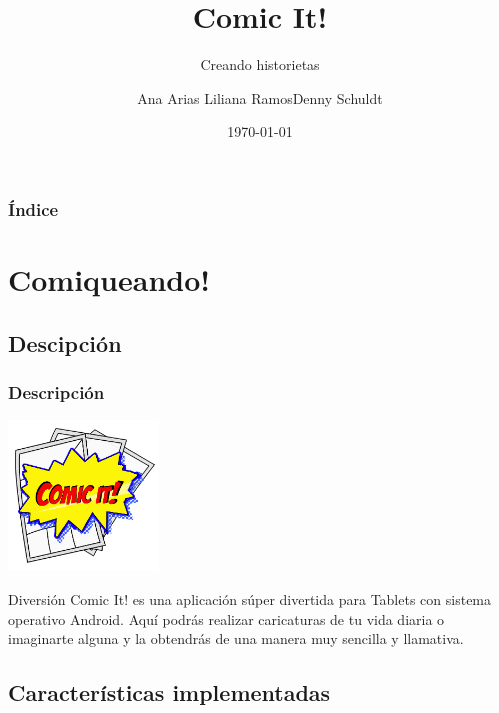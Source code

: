 \documentclass[utf8]{beamer}
\title[Comic It!]{Comic It!}
\subtitle{Creando historietas}
\author[Ana Arias,Liliana Ramos,Denny Schuldt]
{Ana Arias \newline Liliana Ramos\newline Denny Schuldt}
\institute[ESPOL]
{
  Escuela Superior Politécnica del Litoral

}
\date{\today}
\begin{document}
\frame{\titlepage}

\begin{frame}
  \frametitle{Índice}
  \tableofcontents
\end{frame}

\section{Comiqueando!}
\subsection{Descipción}

\begin{frame}
  \frametitle{Descripción}

\begin{center}
		\begingroup
			\includegraphics[width=0.30\textwidth]{imagenes/comicit.jpg}
		\endgroup
	\end{center}

  \begin{block}{Diversión}
Comic It! es una aplicación súper divertida para Tablets con sistema operativo Android. Aquí podrás realizar caricaturas de tu vida diaria o imaginarte alguna y la obtendrás de una manera muy sencilla y llamativa.
  \end{block}
       
 
\end{frame}

\subsection{Características implementadas}
\end{document}
